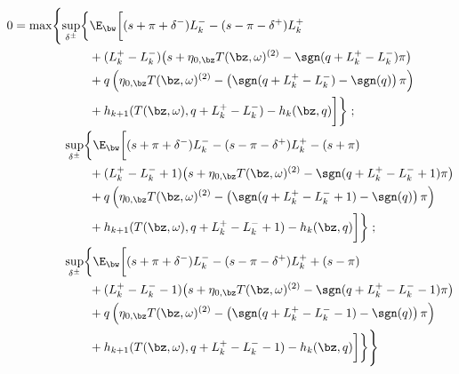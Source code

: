 \documentclass[12pt]{article}
\begin{document}
\begin{equation}
\label{eq:discreteDPE}
\begin{split}
0 & = \max \Biggl\lbrace 
\sup_{\delta^\pm} \biggl\lbrace \E_{\bw} \biggl[
(s + \pi + \delta^-)L_k^- - (s - \pi - \delta^+)L_k^+ \\
& \hphantom{\sup_{\bu} \biggl\lbrace \E_{\bw} \biggl[ {}+{}} + (L_k^+ - L_k^-) \bigl( s + \eta_{0,\bz} T(\bz, \omega)^{(2)}  -\sgn( q + L_k^+ - L_k^-)\pi   \bigr) \\
& \hphantom{\sup_{\bu} \biggl\lbrace \E_{\bw} \biggl[ {}+{}} + q\left( \eta_{0,\bz} T(\bz, \omega)^{(2)}  -\left( \sgn( q + L_k^+ - L_k^-) - \sgn(q) \right) \pi \right) \\
& \hphantom{\sup_{\bu} \biggl\lbrace \E_{\bw} \biggl[ {}+{}} + h_{k+1}(T(\bz,\omega), q + L_k^+ - L_k^- ) -  h_k(\bz,q) \biggr] \biggr\rbrace \; ;\\
& \hphantom{{}={} \max \biggl\lbrace } \sup_{\delta^\pm} \biggl\lbrace \E_{\bw} \biggl[
(s + \pi + \delta^-)L_k^- - (s - \pi - \delta^+)L_k^+ - (s + \pi)\\
& \hphantom{\sup_{\bu} \biggl\lbrace \E_{\bw} \biggl[ {}+{}} + (L_k^+ - L_k^- +1) \bigl( s + \eta_{0,\bz} T(\bz, \omega)^{(2)}  -\sgn( q + L_k^+ - L_k^- +1)\pi   \bigr) \\
& \hphantom{\sup_{\bu} \biggl\lbrace \E_{\bw} \biggl[ {}+{}} + q\left( \eta_{0,\bz} T(\bz, \omega)^{(2)}  -\left( \sgn( q + L_k^+ - L_k^- +1) - \sgn(q) \right) \pi \right) \\
& \hphantom{\sup_{\bu} \biggl\lbrace \E_{\bw} \biggl[ {}+{}} + h_{k+1}(T(\bz,\omega), q + L_k^+ - L_k^- + 1) -  h_k(\bz,q) \biggr] \biggr\rbrace \; ; \\
& \hphantom{{}={} \max \biggl\lbrace } \sup_{\delta^\pm} \biggl\lbrace \E_{\bw} \biggl[
(s + \pi + \delta^-)L_k^- - (s - \pi - \delta^+)L_k^+ + (s - \pi) \\
& \hphantom{\sup_{\bu} \biggl\lbrace \E_{\bw} \biggl[ {}+{}} + (L_k^+ - L_k^- -1) \bigl( s + \eta_{0,\bz} T(\bz, \omega)^{(2)}  -\sgn( q + L_k^+ - L_k^- -1)\pi   \bigr) \\
& \hphantom{\sup_{\bu} \biggl\lbrace \E_{\bw} \biggl[ {}+{}} + q\left( \eta_{0,\bz} T(\bz, \omega)^{(2)}  -\left( \sgn( q + L_k^+ - L_k^- -1) - \sgn(q) \right) \pi \right) \\
& \hphantom{\sup_{\bu} \biggl\lbrace \E_{\bw} \biggl[ {}+{}} + h_{k+1}(T(\bz,\omega), q + L_k^+ - L_k^- -1) -  h_k(\bz,q) \biggr] \biggr\rbrace  \Biggr\rbrace
\end{split}
\end{equation}
\end{document}
